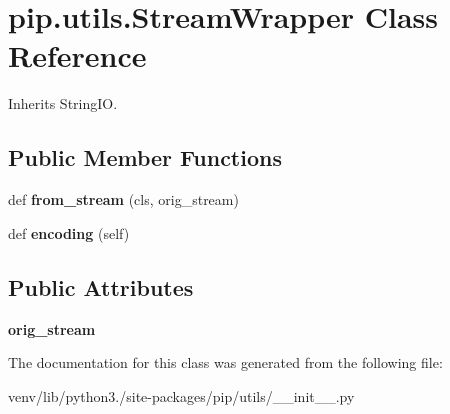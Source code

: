 \hypertarget{classpip_1_1utils_1_1_stream_wrapper}{}\section{pip.\+utils.\+Stream\+Wrapper Class Reference}
\label{classpip_1_1utils_1_1_stream_wrapper}


Inherits String\+IO.

\subsection*{Public Member Functions}
\begin{DoxyCompactItemize}
\item 
\mbox{\label{classpip_1_1utils_1_1_stream_wrapper_a2d835400dc229b67d0ef52b30e2bddb1}} 
def {\bfseries from\+\_\+stream} (cls, orig\+\_\+stream)
\item 
\mbox{\label{classpip_1_1utils_1_1_stream_wrapper_a18de6d8f24d874a67f22ee7c946e22ba}} 
def {\bfseries encoding} (self)
\end{DoxyCompactItemize}
\subsection*{Public Attributes}
\begin{DoxyCompactItemize}
\item 
\mbox{\label{classpip_1_1utils_1_1_stream_wrapper_a9d15e2994befe461359ad34b7469c717}} 
{\bfseries orig\+\_\+stream}
\end{DoxyCompactItemize}


The documentation for this class was generated from the following file\+:\begin{DoxyCompactItemize}
\item 
venv/lib/python3./site-\/packages/pip/utils/\+\_\+\+\_\+init\+\_\+\+\_\+.\+py\end{DoxyCompactItemize}
